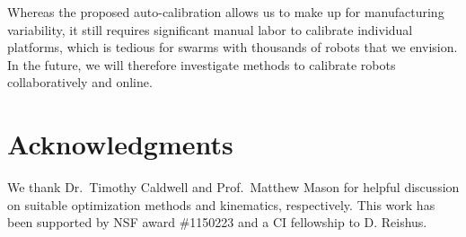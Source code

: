 \documentclass[letterpaper, 10pt, conference]{ieeeconf}
\begin{document}
Whereas the proposed auto-calibration allows us to make up for manufacturing variability, it still requires significant manual labor to calibrate individual platforms, which is tedious for swarms with thousands of robots that we envision. In the future, we will therefore investigate methods to calibrate robots collaboratively and online.  

\section*{Acknowledgments} We thank Dr.\ Timothy Caldwell and Prof.\ Matthew Mason for helpful discussion on suitable optimization methods and kinematics, respectively.   
This work has been supported by NSF award \#1150223 and a CI fellowship to D. Reishus.




\end{document}
